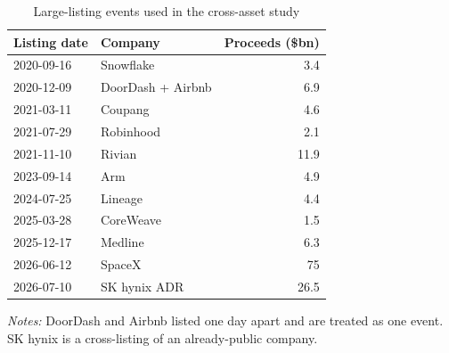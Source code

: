 \begin{table}[!htbp]\centering\small
\caption{Large-listing events used in the cross-asset study}\label{tab:events}

\begin{threeparttable}
\begin{tabular}{llr}
\toprule
Listing date & Company & Proceeds (\$bn) \\
\midrule
2020-09-16 & Snowflake & 3.4 \\
2020-12-09 & DoorDash + Airbnb & 6.9 \\
2021-03-11 & Coupang & 4.6 \\
2021-07-29 & Robinhood & 2.1 \\
2021-11-10 & Rivian & 11.9 \\
2023-09-14 & Arm & 4.9 \\
2024-07-25 & Lineage & 4.4 \\
2025-03-28 & CoreWeave & 1.5 \\
2025-12-17 & Medline & 6.3 \\
2026-06-12 & SpaceX & 75 \\
2026-07-10 & SK hynix ADR & 26.5 \\
\bottomrule
\end{tabular}
\begin{tablenotes}[flushleft]\footnotesize
\item \textit{Notes:} DoorDash and Airbnb listed one day apart and are treated as one event. SK hynix is a cross-listing of an already-public company.
\end{tablenotes}
\end{threeparttable}

\end{table}

